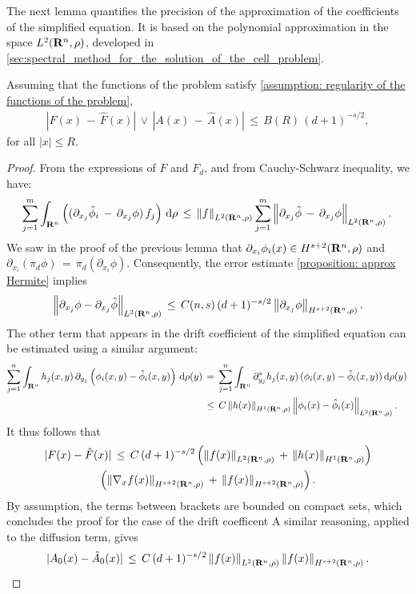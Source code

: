The next lemma quantifies the precision of the approximation of the coefficients of the simplified equation. It is based on the polynomial approximation in the space $L^{2}(\mathbf R^n,\rho)$, developed in \cref{sec:spectral_method_for_the_solution_of_the_cell_problem}. 
\begin{lemma}
Assuming that the functions of the problem satisfy \cref{assumption: regularity
    of the functions of the problem}, 
\begin{gather*}
    |F(x) \,-\, \hat F(x)| \, \vee \, |A(x) \,-\, \hat A(x)| \, \leq \,  B(R) \,(d+1)^{-s/2},
\end{gather*}
for all $|x| \leq R$.
\label{lemma: Approximation coefficients}
\begin{proof}
    From the expressions of $F$ and $F_d$, and from Cauchy-Schwarz inequality, we have:
    $$ \sum^{m}_{j=1} \int_{\mathbf R^n}  \left((\partial_{x_j}\hat \phi_i \,-\, \partial_{x_j}\phi)\, f_j\right) \,\mathrm d \rho \,\leq\, \left\| f \right\|_{L^{2}(\mathbf R^n, \rho) }\sum^{m}_{j=1}  \left\| \partial_{x_j}\hat \phi \,-\, \partial_{x_j}\phi \right\|_{L^{2}(\mathbf R^n, \rho)}. \, $$
    We saw in the proof of the previous lemma that $\partial_{x_i} \phi_i(x)
    \in H^{s+2}(\mathbf R^n, \rho)$ and $\partial_{x_i} (\pi_d \phi) \,=\,
    \pi_d (\partial_{x_i}\phi)$. Consequently, the error estimate
    \cref{proposition: approx Hermite} implies
    $$
        \left\| \partial_{x_j}\phi- \partial_{x_j}\hat \phi \right\|_{L^{2}(\mathbf R^n,\rho) } \,\leq\, C(n,s) \, (d+1)^{-s/2} \left\| \partial_{x_j}\phi \right\|_{H^{s+2}(\mathbf R^n, \rho)}.
    $$
    The other term that appears in the drift coefficient of the simplified
    equation can be estimated using a similar argument:
    \begin{align*}
        \sum^{n}_{j=1} \int_{\mathbf R^n} h_j(x,y) \, \partial_{y_j} \left(\phi_i(x,y)-\hat\phi_i(x,y)\right) \,\mathrm d \rho(y) \,&=\,\sum^{n}_{j=1} \int_{\mathbf R^n} \partial^*_{y_j} h_j(x,y) \, (\phi_i(x,y)-\hat \phi_i(x,y)) \,\mathrm d \rho(y) \,\\ &\leq\,C \left\| h(x) \right\|_{H^{1}(\mathbf R^n, \rho)} \left\| \phi_i(x) - \hat \phi_i(x) \right\|_{L^{2}(\mathbf R^n, \rho)}.
    \end{align*}
    It thus follows that
    \begin{multline*}
        |F(x) - \hat F(x)| \,\leq\, C \,(d+1)^{-s/2}\left(\left\| f(x) \right\|_{L^{2}(\mathbf R^n,\rho)} \,+\, \left\| h(x) \right\|_{H^{1}(\mathbf R^n, \rho)} \right) \\ \left(\left\| \nabla_x f(x) \right\|_{H^{s+2}(\mathbf R^n, \rho)} \,+\,\left\| f(x) \right\|_{H^{s+2}(\mathbf R^n, \rho)}\right).
    \end{multline*}
    By assumption, the terms between brackets are bounded on compact sets,
    which concludes the proof for the case of the drift coefficent A similar
    reasoning, applied to the diffusion term, gives
    $$
        |A_0(x) - \hat A_0(x)| \,\leq\, C \, (d+1)^{-s/2}\left\| f(x) \right\|_{L^{2}(\mathbf R^n,\rho)} \left\| f(x) \right\|_{H^{s+2}(\mathbf R^n, \rho)}.
    $$
    
\end{proof}
\end{lemma}
